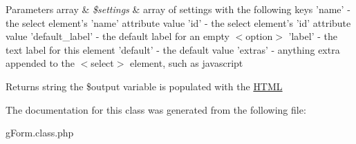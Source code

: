 \begin{DoxyParams}[1]{Parameters}
array & {\em \$settings} & array of settings with the following keys 'name' -\/ the select element's 'name' attribute value 'id' -\/ the select element's 'id' attribute value 'default\-\_\-label' -\/ the default label for an empty $<$option$>$ 'label' -\/ the text label for this element 'default' -\/ the default value 'extras' -\/ anything extra appended to the $<$select$>$ element, such as javascript\\
\hline
\end{DoxyParams}
\begin{DoxyReturn}{Returns}
string the \$output variable is populated with the \hyperlink{class_h_t_m_l}{H\-T\-M\-L} 
\end{DoxyReturn}


The documentation for this class was generated from the following file\-:\begin{DoxyCompactItemize}
\item 
g\-Form.\-class.\-php\end{DoxyCompactItemize}
